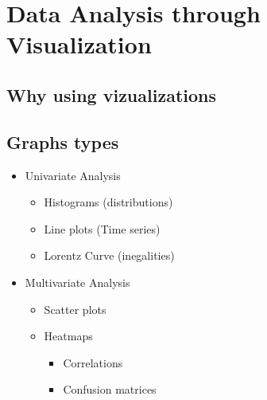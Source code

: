 



\begin{frame}
   \titlepage
\end{frame}



\begin{frame}
   \tableofcontents
\end{frame}

\section{Data Analysis through Visualization}


\subsection{Why using vizualizations}


\subsection{Graphs types}
\begin{itemize}
   \item Univariate Analysis
   \begin{itemize}
      \item Histograms (distributions)
      \item Line plots (Time series)
      \item Lorentz Curve (inegalities)
   \end{itemize}
   \item Multivariate Analysis
   \begin{itemize}
      \item Scatter plots
      \item Heatmaps
      \begin{itemize}
         \item Correlations
         \item Confusion matrices
      \end{itemize}
   \end{itemize}
\end{itemize}


